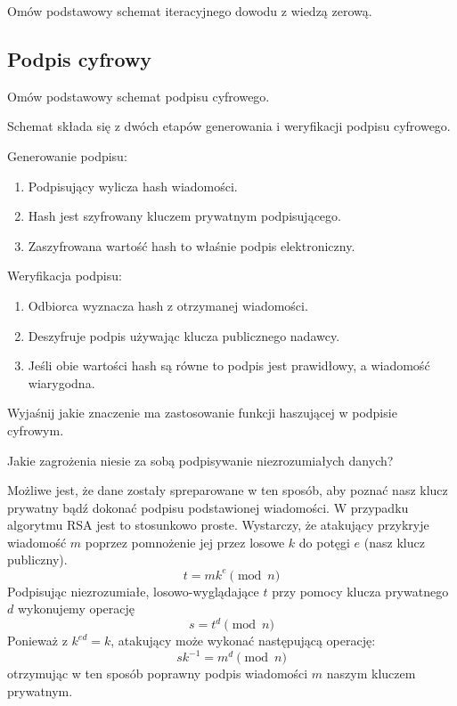 \documentclass[answers,11pt]{exam}
\begin{document}
\begin{questions}
\question Omów podstawowy schemat iteracyjnego dowodu z wiedzą zerową.

\end{questions}


\subsection{Podpis cyfrowy}

\begin{questions}

\question Omów podstawowy schemat podpisu cyfrowego.
\begin{solution}
Schemat składa się z dwóch etapów generowania i weryfikacji podpisu cyfrowego.

Generowanie podpisu:
\begin{enumerate}
\item Podpisujący wylicza hash wiadomości.
\item Hash jest szyfrowany kluczem prywatnym podpisującego.
\item Zaszyfrowana wartość hash to właśnie podpis elektroniczny.
\end{enumerate}

Weryfikacja podpisu:
\begin{enumerate}
\item Odbiorca wyznacza hash z otrzymanej wiadomości.
\item Deszyfruje podpis używając klucza publicznego nadawcy.
\item Jeśli obie wartości hash są równe to podpis jest prawidłowy, a wiadomość wiarygodna.
\end{enumerate}
\end{solution}


\question Wyjaśnij jakie znaczenie ma zastosowanie funkcji haszującej w podpisie cyfrowym.

\question Jakie zagrożenia niesie za sobą podpisywanie niezrozumiałych danych?
\begin{solution}
Możliwe jest, że dane zostały spreparowane w ten sposób, aby poznać nasz klucz prywatny bądź dokonać podpisu podstawionej wiadomości. W przypadku algorytmu RSA jest to stosunkowo proste. Wystarczy, że atakujący przykryje wiadomość $m$ poprzez pomnożenie jej przez losowe $k$ do potęgi $e$ (nasz klucz publiczny). 
\begin{equation}
t = m k^e \pmod{n}
\end{equation}
Podpisując niezrozumiałe, losowo-wyglądające $t$ przy pomocy klucza prywatnego $d$ wykonujemy operację
\begin{equation}
s = t^d \pmod{n}
\end{equation}
Ponieważ z $k^{ed} = k$, atakujący może wykonać następującą operację:
\begin{equation}
sk^{-1} = m^d \pmod{n}
\end{equation}
otrzymując w ten sposób poprawny podpis wiadomości $m$ naszym kluczem prywatnym.
\end{solution}

\end{questions}
\end{document}
